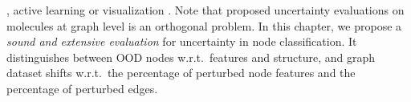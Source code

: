 \citep{Zhao2020}, active learning \cite{Ng2018} or visualization \citep{Borovitskiy2020}. Note that proposed uncertainty evaluations on molecules at graph level \citep{Zhang2019, Ryu2019, Akita2018, uncertainty-nn-molecules, uncertainty-material-prediction} is an orthogonal problem. In this chapter, we propose a \emph{sound and extensive evaluation} for uncertainty in node classification. It distinguishes between OOD nodes w.r.t.\ features and structure, and graph dataset shifts w.r.t.\ the percentage of perturbed node features and the percentage of perturbed edges.
